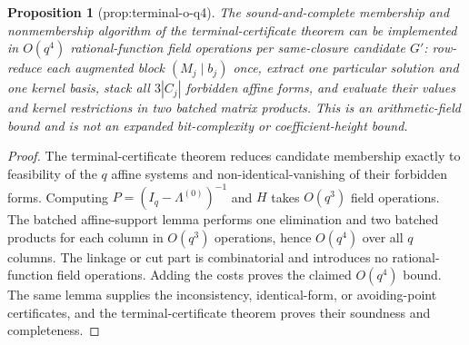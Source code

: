 \documentclass{article}
\newtheorem{proposition}{Proposition}
\begin{document}
\begin{proposition}[prop:terminal-o-q4]\label{prop:terminal-o-q4}
The sound-and-complete membership and nonmembership algorithm of the terminal-certificate theorem can be implemented in \(O(q^4)\) rational-function field operations per same-closure candidate \(G'\): row-reduce each augmented block \((M_j\mid b_j)\) once, extract one particular solution and one kernel basis, stack all \(3|C_j|\) forbidden affine forms, and evaluate their values and kernel restrictions in two batched matrix products.  This is an arithmetic-field bound and is not an expanded bit-complexity or coefficient-height bound.
\end{proposition}
\begin{proof}
The terminal-certificate theorem reduces candidate membership exactly to feasibility of the \(q\) affine systems and non-identical-vanishing of their forbidden forms.  Computing \(P=(I_q-\Lambda^{(0)})^{-1}\) and \(H\) takes \(O(q^3)\) field operations.  The batched affine-support lemma performs one elimination and two batched products for each column in \(O(q^3)\) operations, hence \(O(q^4)\) over all \(q\) columns.  The linkage or cut part is combinatorial and introduces no rational-function field operations.  Adding the costs proves the claimed \(O(q^4)\) bound.  The same lemma supplies the inconsistency, identical-form, or avoiding-point certificates, and the terminal-certificate theorem proves their soundness and completeness.
\end{proof}
\end{document}
